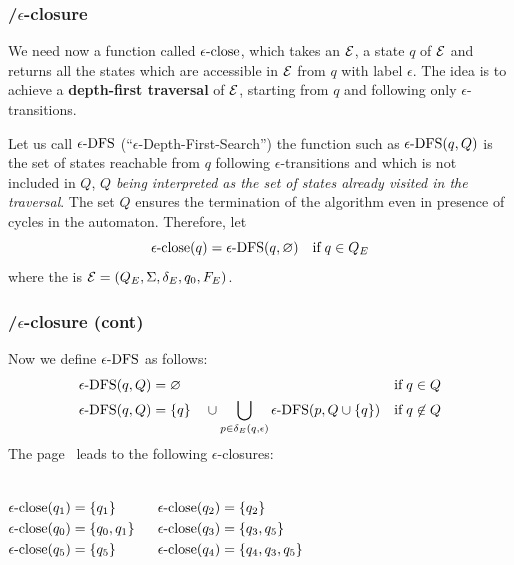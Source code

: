 %
\begin{frame}
\frametitle{\eNFA{}/\(\epsilon\)-closure}

We need now a function called \textbf{\(\epsilon\text{-close}\)}, which takes an
\eNFA \(\cal E\), a state \(q\) of \(\cal E\) and returns all the
states which are accessible in \(\cal E\) from \(q\) with label
\(\epsilon\). The idea is to achieve a \textbf{depth-first traversal}
of \(\cal E\), starting from \(q\) and following only
\(\epsilon\)-transitions.

\bigskip

Let us call \(\epsilon\text{-DFS}\) (``\(\epsilon\)-Depth-First-Search'') the
function such as \(\epsilon\text{-DFS}(q, Q)\) is the set of states reachable from
\(q\) following \(\epsilon\)-transitions and which is not included in
\(Q\), \emph{\(Q\) being interpreted as the set of states already
  visited in the traversal}. The set \(Q\) ensures the termination of
the algorithm even in presence of cycles in the automaton. Therefore,
let
\[
\epsilon\text{-close} (q) = \epsilon\text{-DFS} (q, \varnothing) \quad \text{if} \; q \in Q_E
\]
where the \eNFA is \({\cal E} = (Q_E, \Sigma, \delta_E, q_0, F_E)\).

\end{frame}

%
\begin{frame}
\frametitle{\eNFA{}/\(\epsilon\)-closure (cont)}

Now we define \(\epsilon\text{-DFS}\) as follows:
\begin{align}
   \epsilon\text{-DFS} (q, Q)
&= \varnothing
& \text{if} \; q \in Q \label{eDFS_1}\\
  \epsilon\text{-DFS} (q, Q)
&= \{q\} \quad \cup \bigcup_{p \in \delta_E(q,\epsilon)}{\epsilon\text{-DFS} (p, Q
    \cup \{q\})}
& \text{if} \; q \not\in Q \label{eDFS_2}
\end{align}
The \eNFA page~\pageref{enfa_num} leads to the
following \(\epsilon\)-closures:
\begin{columns}
  \begin{align*}
    \epsilon\text{-close} (q_1) &= \{q_1\}\\
    \epsilon\text{-close} (q_0) &= \{q_0, q_1\}\\
    \epsilon\text{-close} (q_5) &= \{q_5\}
  \end{align*}

  \begin{align*}
    \epsilon\text{-close} (q_2) &= \{q_2\}\\
    \epsilon\text{-close} (q_3) &= \{q_3, q_5\}\\
    \epsilon\text{-close} (q_4) &= \{q_4, q_3, q_5\}
  \end{align*}
\end{columns}

\end{frame}

